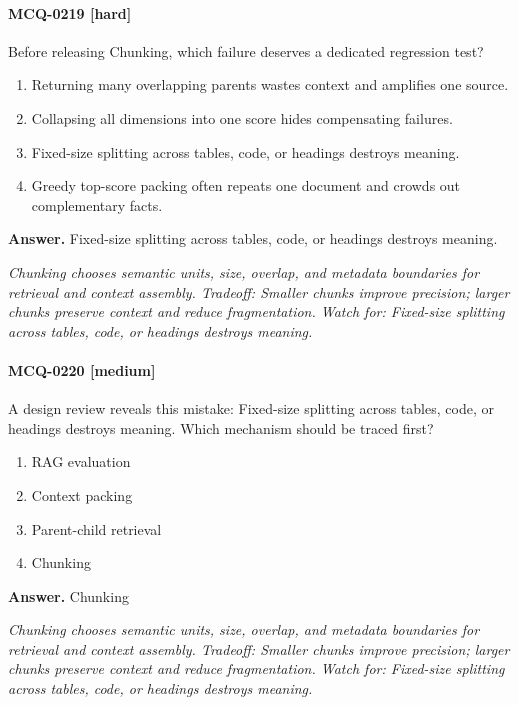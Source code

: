 \paragraph{MCQ-0219 [hard]} Before releasing Chunking, which failure deserves a dedicated regression test?
\begin{enumerate}[label=\Alph*.]
\item Returning many overlapping parents wastes context and amplifies one source.
\item Collapsing all dimensions into one score hides compensating failures.
\item Fixed-size splitting across tables, code, or headings destroys meaning.
\item Greedy top-score packing often repeats one document and crowds out complementary facts.
\end{enumerate}
\noindent\textbf{Answer.} Fixed-size splitting across tables, code, or headings destroys meaning.
\par\textit{Chunking chooses semantic units, size, overlap, and metadata boundaries for retrieval and context assembly. Tradeoff: Smaller chunks improve precision; larger chunks preserve context and reduce fragmentation. Watch for: Fixed-size splitting across tables, code, or headings destroys meaning.}
\paragraph{MCQ-0220 [medium]} A design review reveals this mistake: Fixed-size splitting across tables, code, or headings destroys meaning. Which mechanism should be traced first?
\begin{enumerate}[label=\Alph*.]
\item RAG evaluation
\item Context packing
\item Parent-child retrieval
\item Chunking
\end{enumerate}
\noindent\textbf{Answer.} Chunking
\par\textit{Chunking chooses semantic units, size, overlap, and metadata boundaries for retrieval and context assembly. Tradeoff: Smaller chunks improve precision; larger chunks preserve context and reduce fragmentation. Watch for: Fixed-size splitting across tables, code, or headings destroys meaning.}

